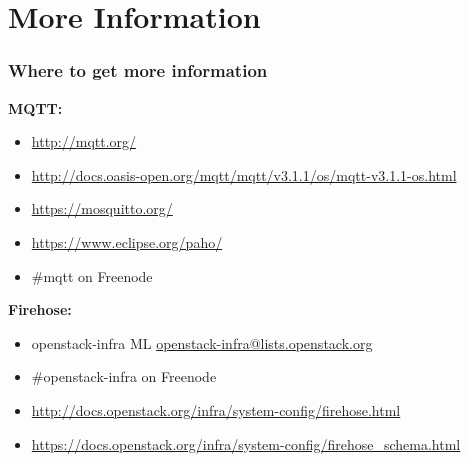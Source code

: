 \documentclass[aspectratio=169,11pt,hyperref={colorlinks=true}]{beamer}
\begin{document}
\section{More Information}
\begin{frame}
\frametitle{Where to get more information}
    \textbf{MQTT:}
    \begin{itemize}
	    \item \href{http://mqtt.org/}{http://mqtt.org/}
        \item \href{http://docs.oasis-open.org/mqtt/mqtt/v3.1.1/os/mqtt-v3.1.1-os.html}{http://docs.oasis-open.org/mqtt/mqtt/v3.1.1/os/mqtt-v3.1.1-os.html}
	    \item \href{https://mosquitto.org/}{https://mosquitto.org/}
        \item \href{https://www.eclipse.org/paho/}{https://www.eclipse.org/paho/}
        \item \#mqtt on Freenode
    \end{itemize}
    \textbf{Firehose:}
    \begin{itemize}
        \item openstack-infra ML\: \href{mailto:openstack-infra@lists.openstack.org}{openstack-infra@lists.openstack.org}
        \item \#openstack-infra on Freenode
	    \item \href{http://docs.openstack.org/infra/system-config/firehose.html}{http://docs.openstack.org/infra/system-config/firehose.html}
        \item \href{https://docs.openstack.org/infra/system-config/firehose_schema.html}{https://docs.openstack.org/infra/system-config/firehose\_schema.html}
    \end{itemize}
\end{frame}
\end{document}
